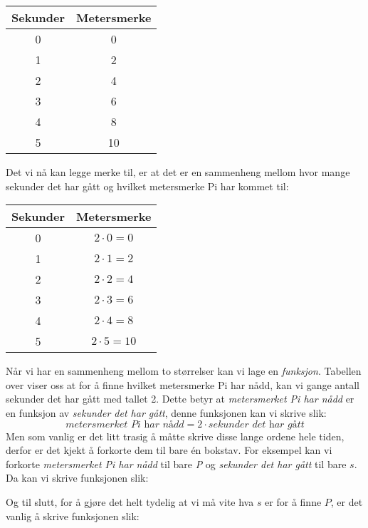 \begin{center}
	\begin{tabular}{|c|c|}
		\hline
		\textbf{Sekunder} & \textbf{Metersmerke}\\ \hline 
		0 & 0\\ \hline 
		1 & 2\\ \hline 
		2 & 4 \\\hline 
		3 & 6 \\\hline 
		4 & 8 \\\hline 
		5 & 10 \\\hline 
	\end{tabular}
\end{center}
Det vi nå kan legge merke til, er at det er en sammenheng mellom hvor mange sekunder det har gått og hvilket metersmerke Pi har kommet til:
\begin{center}
	\begin{tabular}{|c|c|}
		\hline
		\textbf{Sekunder} & \textbf{Metersmerke}\\ \hline 
		0 & $ 2\cdot0=0 $\\ \hline 
		1 & $ 2\cdot1=2 $\\ \hline 
		2 & $ 2\cdot2=4 $ \\\hline 
		3 & $ 2\cdot3=6 $ \\\hline 
		4 & $ 2\cdot4=8 $ \\\hline 
		5 & $ 2\cdot5=10 $\\\hline 
	\end{tabular}
\end{center}
Når vi har en sammenheng mellom to størrelser kan vi lage en \textit{funksjon}. Tabellen over viser oss at for å finne hvilket metersmerke Pi har nådd, kan vi gange antall sekunder det har gått med tallet 2. Dette betyr at \textit{metersmerket Pi har nådd} er en funksjon av \textit{sekunder det har gått}, denne funksjonen kan vi skrive slik:
\[ \textit{metersmerket Pi har nådd}=2\cdot\textit{sekunder det har gått} \]
Men som vanlig er det litt trasig å måtte skrive disse lange ordene hele tiden, derfor er det kjekt å forkorte dem til bare én bokstav. For eksempel kan vi forkorte \textit{metersmerket Pi har nådd} til bare \textit{P} og \textit{sekunder det har gått} til bare $ s $. Da kan vi skrive funksjonen slik:

\quad
{}

Og til slutt, for å gjøre det helt tydelig at vi må vite hva $ s $ er for å finne $ P $, er det vanlig å skrive funksjonen slik:

